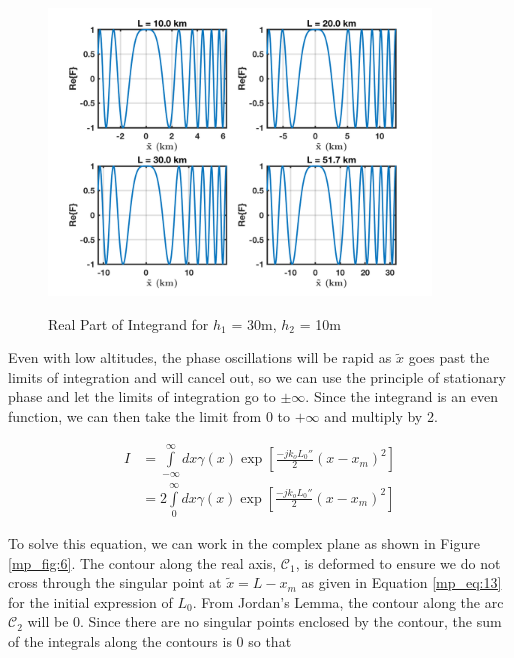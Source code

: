 \begin{figure}[H]
  \begin{center}
\includegraphics[width=4in]{../media/analysis/phaseVariation_30_50}
  \end{center}
  \renewcommand{\baselinestretch}{1} \small\normalsize
  \begin{quote}
  \caption[Real Part of Integrand for $h_1$ = 30m, $h_2$ = 50m]{ Real Part of Integrand for $h_1$ = 30m, $h_2$ = 10m\label{mp_fig:5}}
  \end{quote}
\end{figure}
\renewcommand{\baselinestretch}{2} \small\normalsize

Even with low altitudes, the phase oscillations will be rapid as $\tilde{x}$ goes past the limits of integration and will cancel out, so we can use the principle of stationary phase and let the limits of integration go to $\pm\infty$. Since the integrand is an even function, we can then take the limit from $0$ to $+\infty$ and multiply by 2.

\begin{equation}
\begin{aligned}
I&=\int\limits_{-\infty}^{\infty}dx\gamma(x)\exp\left[\frac{-jk_oL_0''}{2}(x-x_m)^2\right]\\
&=2\int\limits_{0}^{\infty}dx\gamma(x)\exp\left[\frac{-jk_oL_0''}{2}(x-x_m)^2\right]
\end{aligned}
\label{mp_eq:23}
\end{equation}

To solve this equation, we can work in the complex plane as shown in Figure \ref{mp_fig:6}. The contour along the real axis, $\mathcal{C}_1$, is deformed to ensure we do not cross through the singular point at $\tilde{x} = L-x_m$ as given in Equation \ref{mp_eq:13} for the initial expression of $L_0$. From Jordan's Lemma, the contour along the arc $\mathcal{C}_2$ will be $0$. Since there are no singular points enclosed by the contour, the sum of the integrals along the contours is $0$ so that

